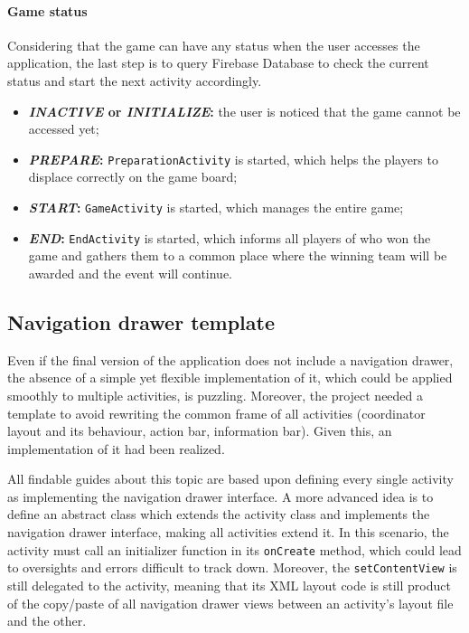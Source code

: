 			\paragraph{Game status}
			
			Considering that the game can have any status when the user accesses the application, the last step is to query Firebase Database to check the current status and start the next activity accordingly.
			\begin{itemize}
				\item \textbf{\emph{INACTIVE} or \emph{INITIALIZE}:} the user is noticed that the game cannot be accessed yet;
				\item \textbf{\emph{PREPARE}:} \lstinline|PreparationActivity| is started, which helps the players to displace correctly on the game board;
				\item \textbf{\emph{START}:} \lstinline|GameActivity| is started, which manages the entire game;
				\item \textbf{\emph{END}:} \lstinline|EndActivity| is started, which informs all players of who won the game and gathers them to a common place where the winning team will be awarded and the event will continue.
			\end{itemize}
		
		\subsection{Navigation drawer template}\label{focus:drawer}
		
			Even if the final version of the application does not include a navigation drawer, the absence of a simple yet flexible implementation of it, which could be applied smoothly to multiple activities, is puzzling.
			Moreover, the project needed a template to avoid rewriting the common frame of all activities (coordinator layout and its behaviour, action bar, information bar).
			Given this, an implementation of it had been realized.
			
			All findable guides about this topic are based upon defining every single activity as implementing the navigation drawer interface.
			A more advanced idea is to define an abstract class which extends the activity class and implements the navigation drawer interface, making all activities extend it.
			In this scenario, the activity must call an initializer function in its \lstinline|onCreate| method, which could lead to oversights and errors difficult to track down. Moreover, the \lstinline|setContentView| is still delegated to the activity, meaning that its XML layout code is still product of the copy/paste of all navigation drawer views between an activity's layout file and the other.
			
